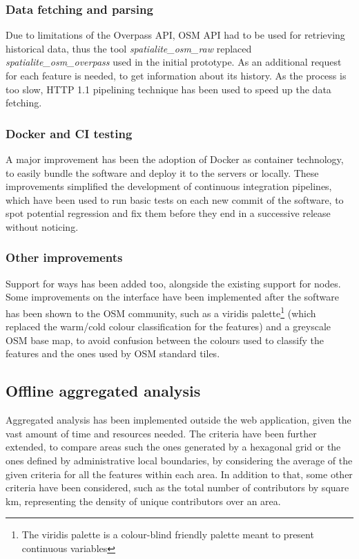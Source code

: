 \documentclass{Configuration_Files/PoliMi3i_thesis}
\begin{document}
\subsubsection{Data fetching and parsing}

Due to limitations of the Overpass API, OSM API had to be used for retrieving historical data, thus the tool \textit{spatialite\_osm\_raw} replaced \textit{spatialite\_osm\_overpass} used in the initial prototype. As an additional request for each feature is needed, to get information about its history. As the process is too slow, HTTP 1.1 pipelining technique has been used to speed up the data fetching. 

\subsubsection{Docker and CI testing}

A major improvement has been the adoption of Docker as container technology, to easily bundle the software and deploy it to the servers or locally. These improvements simplified the development of continuous integration pipelines, which have been used to run basic tests on each new commit of the software, to spot potential regression and fix them before they end in a successive release without noticing.

\subsubsection{Other improvements}

Support for ways has been added too, alongside the existing support for nodes.
Some improvements on the interface have been implemented after the software has been shown to the OSM community, such as a viridis palette\footnote{The viridis palette is a colour-blind friendly palette meant to present continuous variables} (which replaced the warm/cold colour classification for the features) and a greyscale OSM base map, to avoid confusion between the colours used to classify the features and the ones used by OSM standard tiles.

\subsection{Offline aggregated analysis}

Aggregated analysis has been implemented outside the web application, given the vast amount of time and resources needed. The criteria have been further extended, to compare areas such the ones generated by a hexagonal grid or the ones defined by administrative local boundaries, by considering the average of the given criteria for all the features within each area. In addition to that, some other criteria have been considered, such as the total number of contributors by square km, representing the density of unique contributors over an area.
\end{document}
